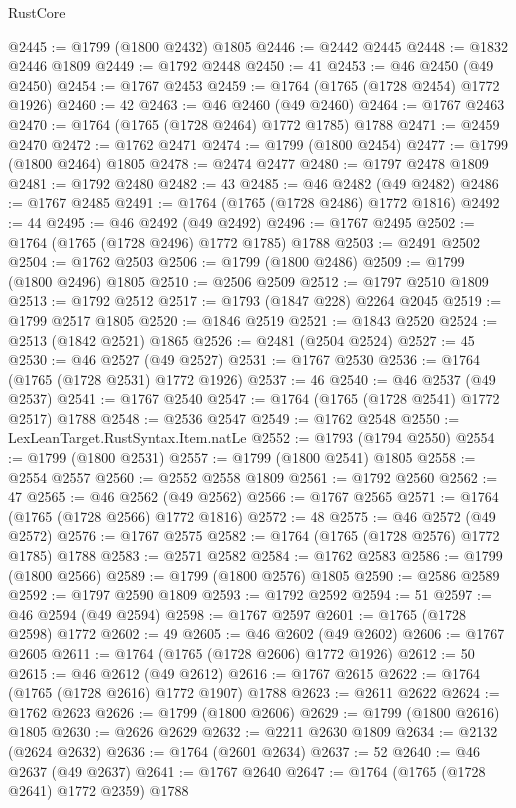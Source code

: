\begin{lexlean}{RustCore}
\begin{coremodule}
@2445 := @1799 (@1800 @2432) @1805
@2446 := @2442 @2445
@2448 := @1832 @2446 @1809
@2449 := @1792 @2448
@2450 := 41
@2453 := @46 @2450 (@49 @2450)
@2454 := @1767 @2453
@2459 := @1764 (@1765 (@1728 @2454) @1772 @1926)
@2460 := 42
@2463 := @46 @2460 (@49 @2460)
@2464 := @1767 @2463
@2470 := @1764 (@1765 (@1728 @2464) @1772 @1785) @1788
@2471 := @2459 @2470
@2472 := @1762 @2471
@2474 := @1799 (@1800 @2454)
@2477 := @1799 (@1800 @2464) @1805
@2478 := @2474 @2477
@2480 := @1797 @2478 @1809
@2481 := @1792 @2480
@2482 := 43
@2485 := @46 @2482 (@49 @2482)
@2486 := @1767 @2485
@2491 := @1764 (@1765 (@1728 @2486) @1772 @1816)
@2492 := 44
@2495 := @46 @2492 (@49 @2492)
@2496 := @1767 @2495
@2502 := @1764 (@1765 (@1728 @2496) @1772 @1785) @1788
@2503 := @2491 @2502
@2504 := @1762 @2503
@2506 := @1799 (@1800 @2486)
@2509 := @1799 (@1800 @2496) @1805
@2510 := @2506 @2509
@2512 := @1797 @2510 @1809
@2513 := @1792 @2512
@2517 := @1793 (@1847 @228) @2264 @2045
@2519 := @1799 @2517 @1805
@2520 := @1846 @2519
@2521 := @1843 @2520
@2524 := @2513 (@1842 @2521) @1865
@2526 := @2481 (@2504 @2524)
@2527 := 45
@2530 := @46 @2527 (@49 @2527)
@2531 := @1767 @2530
@2536 := @1764 (@1765 (@1728 @2531) @1772 @1926)
@2537 := 46
@2540 := @46 @2537 (@49 @2537)
@2541 := @1767 @2540
@2547 := @1764 (@1765 (@1728 @2541) @1772 @2517) @1788
@2548 := @2536 @2547
@2549 := @1762 @2548
@2550 := LexLeanTarget.RustSyntax.Item.natLe
@2552 := @1793 (@1794 @2550)
@2554 := @1799 (@1800 @2531)
@2557 := @1799 (@1800 @2541) @1805
@2558 := @2554 @2557
@2560 := @2552 @2558 @1809
@2561 := @1792 @2560
@2562 := 47
@2565 := @46 @2562 (@49 @2562)
@2566 := @1767 @2565
@2571 := @1764 (@1765 (@1728 @2566) @1772 @1816)
@2572 := 48
@2575 := @46 @2572 (@49 @2572)
@2576 := @1767 @2575
@2582 := @1764 (@1765 (@1728 @2576) @1772 @1785) @1788
@2583 := @2571 @2582
@2584 := @1762 @2583
@2586 := @1799 (@1800 @2566)
@2589 := @1799 (@1800 @2576) @1805
@2590 := @2586 @2589
@2592 := @1797 @2590 @1809
@2593 := @1792 @2592
@2594 := 51
@2597 := @46 @2594 (@49 @2594)
@2598 := @1767 @2597
@2601 := @1765 (@1728 @2598) @1772
@2602 := 49
@2605 := @46 @2602 (@49 @2602)
@2606 := @1767 @2605
@2611 := @1764 (@1765 (@1728 @2606) @1772 @1926)
@2612 := 50
@2615 := @46 @2612 (@49 @2612)
@2616 := @1767 @2615
@2622 := @1764 (@1765 (@1728 @2616) @1772 @1907) @1788
@2623 := @2611 @2622
@2624 := @1762 @2623
@2626 := @1799 (@1800 @2606)
@2629 := @1799 (@1800 @2616) @1805
@2630 := @2626 @2629
@2632 := @2211 @2630 @1809
@2634 := @2132 (@2624 @2632)
@2636 := @1764 (@2601 @2634)
@2637 := 52
@2640 := @46 @2637 (@49 @2637)
@2641 := @1767 @2640
@2647 := @1764 (@1765 (@1728 @2641) @1772 @2359) @1788

\end{coremodule}
\end{lexlean}
